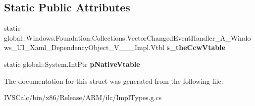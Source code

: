 \subsection*{Static Public Attributes}
\begin{DoxyCompactItemize}
\item 
\mbox{\label{struct_windows_1_1_foundation_1_1_collections_1_1_vector_changed_event_handler___a___windows___ube91dabf53d084dfd6eb7cefa21564f8_a14318e8434d85d69a3ceb1d48c808435}} 
static global\+::\+Windows.\+Foundation.\+Collections.\+Vector\+Changed\+Event\+Handler\+\_\+\+A\+\_\+\+Windows\+\_\+\+U\+I\+\_\+\+Xaml\+\_\+\+Dependency\+Object\+\_\+\+V\+\_\+\+\_\+\+\_\+\+Impl.\+Vtbl {\bfseries s\+\_\+the\+Ccw\+Vtable}
\item 
\mbox{\label{struct_windows_1_1_foundation_1_1_collections_1_1_vector_changed_event_handler___a___windows___ube91dabf53d084dfd6eb7cefa21564f8_a751333cccfba079af5480ea19956510b}} 
static global\+::\+System.\+Int\+Ptr {\bfseries p\+Native\+Vtable}
\end{DoxyCompactItemize}


The documentation for this struct was generated from the following file\+:\begin{DoxyCompactItemize}
\item 
I\+V\+S\+Calc/bin/x86/\+Release/\+A\+R\+M/ilc/Impl\+Types.\+g.\+cs\end{DoxyCompactItemize}
